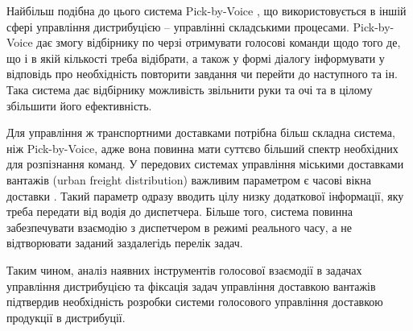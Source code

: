 Найбільш подібна до цього система Pick-by-Voice \cite{Pick-to-Voice}, що використовується в іншій сфері управління дистрибуцією – управлінні складськими процесами. Pick-by-Voice дає змогу відбірнику по черзі отримувати голосові команди щодо того де, що і в якій кількості треба відібрати, а також у формі діалогу інформувати у відповідь про необхідність повторити завдання чи перейти до наступного та ін. Така система дає відбірнику можливість звільнити руки та очі та в цілому збільшити його ефективність.

Для управління ж транспортними доставками потрібна більш складна система, ніж Pick-by-Voice, адже вона повинна мати суттєво більший спектр необхідних для розпізнання команд. У передових системах управління міськими доставками вантажів (urban freight distribution) важливим параметром є часові вікна доставки \cite{Quak_2006}. Такий параметр одразу вводить цілу низку додаткової інформації, яку треба передати від водія до диспетчера. Більше того, система повинна забезпечувати взаємодію з диспетчером в режимі реального часу, а не відтворювати заданий заздалегідь перелік задач. 

Таким чином, аналіз наявних інструментів голосової взаємодії в задачах управління дистрибуцією та фіксація задач управління доставкою вантажів підтвердив необхідність розробки системи голосового управління доставкою продукції в дистрибуції.
